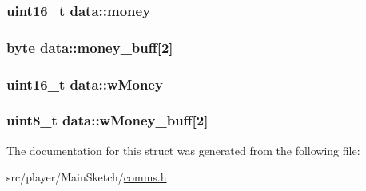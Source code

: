 \hypertarget{structdata_ad772ea43ec2d839008e9489b66b58c2b}{
\subsubsection[{money}]{\setlength{\rightskip}{0pt plus 5cm}uint16\-\_\-t data\-::money}}\label{structdata_ad772ea43ec2d839008e9489b66b58c2b}
\hypertarget{structdata_a291fb2462324a08de344cedeaa5d2e6c}{
\subsubsection[{money\-\_\-buff}]{\setlength{\rightskip}{0pt plus 5cm}byte data\-::money\-\_\-buff\mbox{[}2\mbox{]}}}\label{structdata_a291fb2462324a08de344cedeaa5d2e6c}
\hypertarget{structdata_a458601a4ec019baa22d16beb457f99bd}{
\subsubsection[{w\-Money}]{\setlength{\rightskip}{0pt plus 5cm}uint16\-\_\-t data\-::w\-Money}}\label{structdata_a458601a4ec019baa22d16beb457f99bd}
\hypertarget{structdata_ae14f0bfec778527ea0bb3dc5259a2b35}{
\subsubsection[{w\-Money\-\_\-buff}]{\setlength{\rightskip}{0pt plus 5cm}uint8\-\_\-t data\-::w\-Money\-\_\-buff\mbox{[}2\mbox{]}}}\label{structdata_ae14f0bfec778527ea0bb3dc5259a2b35}


The documentation for this struct was generated from the following file\-:\begin{DoxyCompactItemize}
\item 
src/player/\-Main\-Sketch/\hyperlink{src_2player_2MainSketch_2comms_8h}{comms.\-h}\end{DoxyCompactItemize}
